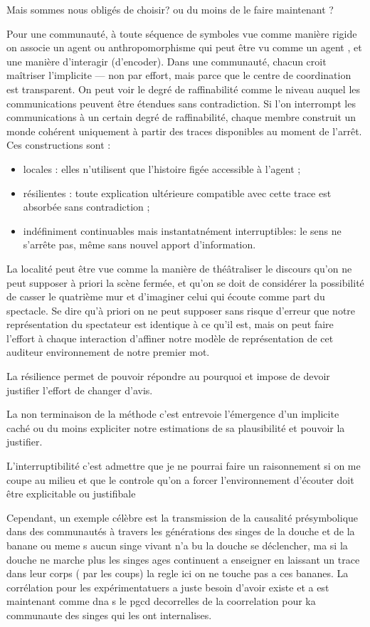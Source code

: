 \documentclass{article}
\begin{document}
Mais sommes nous obligés de choisir? ou du moins de le faire maintenant ?



  Pour une communauté, à toute  séquence de symboles vue comme manière rigide on associe un agent ou anthropomorphisme qui peut être vu comme un agent , et une manière d'interagir (d'encoder).   Dans une communauté, chacun croit maîtriser l’implicite — non par effort, mais parce que le centre de coordination est transparent.
 On peut voir le  degré de raffinabilité comme le niveau auquel les communications peuvent être étendues sans contradiction.
Si l’on interrompt les communications à un certain degré de raffinabilité, chaque membre construit un monde cohérent uniquement à partir des traces disponibles au moment de l’arrêt.
Ces constructions sont :
\begin{itemize}
\item locales : elles n’utilisent que l’histoire figée accessible à l’agent ; 
\item résilientes : toute explication ultérieure compatible avec cette trace est absorbée sans contradiction ;
\item indéfiniment continuables mais instantatnément interruptibles: le sens ne s’arrête pas, même sans nouvel apport d’information.
\end{itemize}

La localité peut être vue comme la manière de théâtraliser le discours qu'on ne peut supposer à priori la scène fermée, et qu'on se doit de considérer la possibilité de casser le quatrième mur et d'imaginer celui qui écoute comme part du spectacle. Se dire qu'à priori  on ne peut supposer  sans risque d'erreur que notre représentation du spectateur est identique à ce qu'il est, mais on peut faire l'effort à chaque interaction  d'affiner notre modèle de représentation de cet auditeur environnement de notre premier mot.

La résilience permet de pouvoir répondre au pourquoi et impose de devoir justifier l'effort de changer d'avis. 

La non terminaison de la méthode c'est entrevoie l'émergence d'un implicite caché ou du moins expliciter notre estimations de sa plausibilité et pouvoir la justifier.

L'interruptibilité c'est admettre que je ne pourrai faire un raisonnement si on me coupe au milieu et que le controle qu'on a forcer l'environnement d'écouter doit être explicitable ou justifibale

Cependant, un exemple célèbre est la transmission de la causalité présymbolique dans des communautés  à travers les générations des singes de la douche et de la banane ou meme s aucun singe vivant n'a bu la douche se déclencher, ma si la douche ne marche plus les singes ages continuent a enseigner en laissant un trace dans leur corps ( par les coups) la regle ici on ne touche pas a ces bananes. La corrélation pour les expérimentatuers a juste besoin d'avoir existe et a est maintenant comme dna s le pgcd decorrelles de la coorrelation pour ka communaute des singes qui les ont internalises. 
\end{document}
